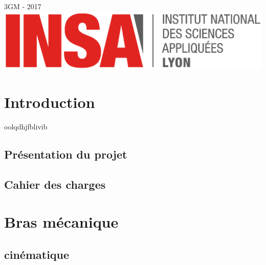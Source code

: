 \documentclass[a4paper, titlepage, twocolumn]{report}
\begin{document}
\begin{titlepage}
{\large 3GM - 2017}\\[3cm] %


\includegraphics [scale = 0.3] {logoINSA.eps}\\


\vfill %

\end{titlepage}



	 
	\chapter {Introduction}
	oolqdhjfblivib
		\section {Présentation du projet}
		\section {Cahier des charges}
	\chapter {Bras mécanique}
		\section {cinématique}
\end{document}
